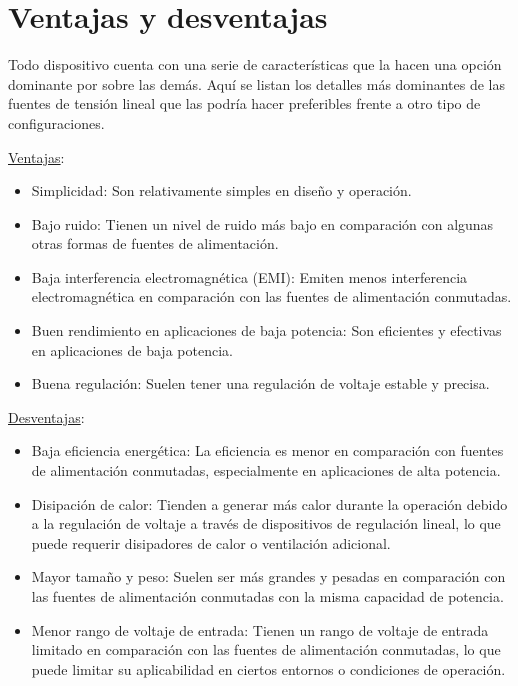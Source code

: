 \section{Ventajas y desventajas}\par 
Todo dispositivo cuenta con una serie de características que la hacen una opción dominante por sobre las demás. Aquí se listan los detalles más dominantes de las fuentes de tensión lineal que las podría hacer preferibles frente a otro tipo de configuraciones.\par 
\underline{Ventajas}:
\begin{itemize}
    \item Simplicidad: Son relativamente simples en diseño y operación.
    \item Bajo ruido: Tienen un nivel de ruido más bajo en comparación con algunas otras formas de fuentes de alimentación.
    \item Baja interferencia electromagnética (EMI): Emiten menos interferencia electromagnética en comparación con las fuentes de alimentación conmutadas.
    \item Buen rendimiento en aplicaciones de baja potencia: Son eficientes y efectivas en aplicaciones de baja potencia.
    \item Buena regulación: Suelen tener una regulación de voltaje estable y precisa.
\end{itemize}\par 
\underline{Desventajas}:
\begin{itemize}
    \item Baja eficiencia energética: La eficiencia es menor en comparación con fuentes de alimentación conmutadas, especialmente en aplicaciones de alta potencia.
    \item Disipación de calor: Tienden a generar más calor durante la operación debido a la regulación de voltaje a través de dispositivos de regulación lineal, lo que puede requerir disipadores de calor o ventilación adicional.
    \item Mayor tamaño y peso: Suelen ser más grandes y pesadas en comparación con las fuentes de alimentación conmutadas con la misma capacidad de potencia.
    \item Menor rango de voltaje de entrada: Tienen un rango de voltaje de entrada limitado en comparación con las fuentes de alimentación conmutadas, lo que puede limitar su aplicabilidad en ciertos entornos o condiciones de operación.
\end{itemize}

